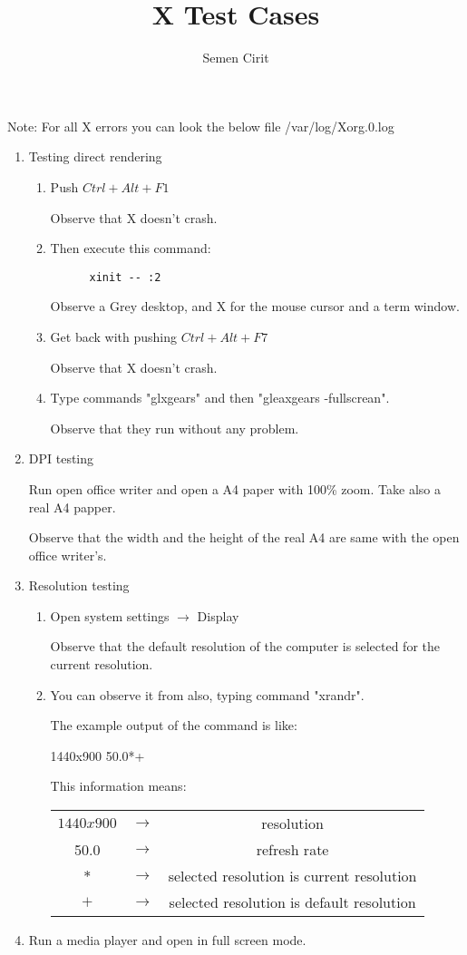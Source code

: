 \documentclass[a4paper,10pt]{article}
\title{X Test Cases}
\author{Semen Cirit}
\begin{document}
\maketitle

 Note:	
  	For all X errors you can look the below file
	/var/log/Xorg.0.log  
\begin{enumerate}
  \item Testing direct rendering
    \begin{enumerate}
    \item  Push $Ctrl+Alt+F1$

	    Observe that X doesn't crash.
    \item  Then execute this command:
	  \begin{verbatim}
	  xinit -- :2
	  \end{verbatim}
	  Observe a Grey desktop, and X for the mouse cursor and a term window.
    \item Get back with pushing $Ctrl+Alt+F7$
    
	  Observe that X doesn't crash.
    \item Type commands "glxgears" and then "gleaxgears -fullscrean".

	  Observe that they run without any problem.
    \end{enumerate}

  \item DPI testing
    
        Run open office writer and open a A4 paper with 100\% zoom. Take also a real A4 papper.

        Observe that the width and the height of the real A4 are same with the open office writer's.
  \item Resolution testing
     \begin{enumerate}
      \item Open system settings $\rightarrow$ Display

	Observe that the default resolution of the computer is selected for the current resolution.
      \item You can observe it from also, typing command "xrandr". 
	  
	  The example output of the command is like:
	  
	  1440x900  50.0*+
	  
	  This information means:
	  \begin{table}[h]
	  \centering
	  \begin{tabular}{|c|c|c|}
		  \hline
		  $1440x900$ & $\rightarrow$ & resolution \\
		  50.0       & $\rightarrow$ & refresh rate \\
		  $*$        & $\rightarrow$ & selected resolution is current resolution \\
		  $+$        & $\rightarrow$ & selected resolution is default resolution \\
		  \hline
	  \end{tabular} 
	  \label{tab:tbl}
	  \end{table}
    \end{enumerate}
 \item  Run a media player and open in full screen mode.


\end{enumerate}
\end{document}
